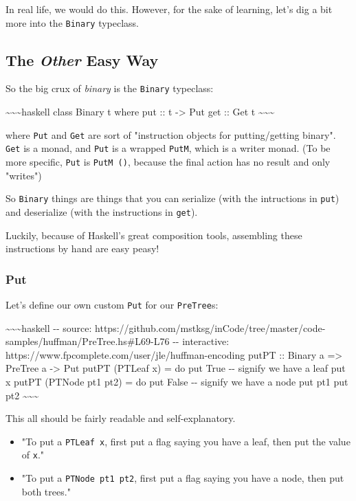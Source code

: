 \documentclass[]{article}
\begin{document}
In real life, we would do this. However, for the sake of learning, let's dig a
bit more into the \texttt{Binary} typeclass.

\subsection{\texorpdfstring{The \emph{Other} Easy Way}{The Other Easy Way}}

So the big crux of \emph{binary} is the \texttt{Binary} typeclass:

\textasciitilde{}\textasciitilde{}\textasciitilde{}haskell class Binary t where
put :: t -\textgreater{} Put get :: Get t
\textasciitilde{}\textasciitilde{}\textasciitilde{}

where \texttt{Put} and \texttt{Get} are sort of "instruction objects for
putting/getting binary". \texttt{Get} is a monad, and \texttt{Put} is a wrapped
\texttt{PutM}, which is a writer monad. (To be more specific, \texttt{Put} is
\texttt{PutM\ ()}, because the final action has no result and only "writes")

So \texttt{Binary} things are things that you can serialize (with the
intructions in \texttt{put}) and deserialize (with the instructions in
\texttt{get}).

Luckily, because of Haskell's great composition tools, assembling these
instructions by hand are easy peasy!

\subsubsection{Put}

Let's define our own custom \texttt{Put} for our \texttt{PreTree}s:

\textasciitilde{}\textasciitilde{}\textasciitilde{}haskell -\/- source:
https://github.com/mstksg/inCode/tree/master/code-samples/huffman/PreTree.hs\#L69-L76
-\/- interactive: https://www.fpcomplete.com/user/jle/huffman-encoding putPT ::
Binary a =\textgreater{} PreTree a -\textgreater{} Put putPT (PTLeaf x) = do put
True -\/- signify we have a leaf put x putPT (PTNode pt1 pt2) = do put False
-\/- signify we have a node put pt1 put pt2
\textasciitilde{}\textasciitilde{}\textasciitilde{}

This all should be fairly readable and self-explanatory.

\begin{itemize}
\item
  "To put a \texttt{PTLeaf\ x}, first put a flag saying you have a leaf, then
  put the value of \texttt{x}."
\item
  "To put a \texttt{PTNode\ pt1\ pt2}, first put a flag saying you have a node,
  then put both trees."
\end{itemize}
\end{document}
